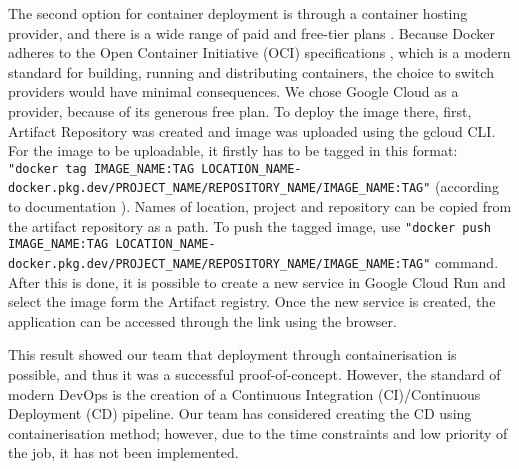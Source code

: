 The second option for container deployment is through a container hosting provider, and there is a wide range of paid and free-tier plans \cite{dockerDeploymentServices}. Because Docker adheres to the Open Container Initiative (OCI) specifications \cite{OCIdocker}, which is a modern standard for building, running and distributing containers, the choice to switch providers would have minimal consequences. We chose Google Cloud as a provider, because of its generous free plan. To deploy the image there, first, Artifact Repository was created and image was uploaded using the gcloud CLI. For the image to be uploadable, it firstly has to be tagged in this format: \texttt{"\lstinline|docker tag IMAGE_NAME:TAG LOCATION_NAME-docker.pkg.dev/PROJECT_NAME/REPOSITORY_NAME/IMAGE_NAME:TAG|"} (according to documentation \cite{GoogleCloudRunDocs}). Names of location, project and repository can be copied from the artifact repository as a path. To push the tagged image, use \lstinline|"docker push IMAGE_NAME:TAG LOCATION_NAME-docker.pkg.dev/PROJECT_NAME/REPOSITORY_NAME/IMAGE_NAME:TAG"| command. After this is done, it is possible to create a new service in Google Cloud Run and select the image form the Artifact registry. Once the new service is created, the application can be accessed through the link using the browser. 

This result showed our team that deployment through containerisation is possible, and thus it was a successful proof-of-concept. However, the standard of modern DevOps is the creation of a Continuous Integration (CI)/Continuous Deployment (CD) pipeline. Our team has considered creating the CD using containerisation method; however, due to the time constraints and low priority of the job, it has not been implemented.